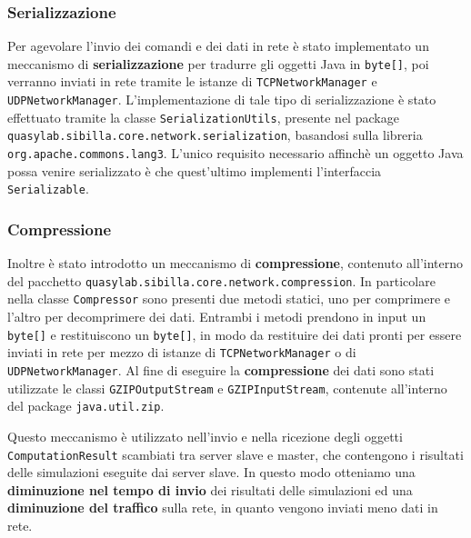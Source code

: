 \subsubsection{Serializzazione}

Per agevolare l'invio dei comandi e dei dati in rete è stato implementato un meccanismo di \textbf{serializzazione} per tradurre gli oggetti Java in \texttt{byte[]}, poi verranno inviati in rete tramite le istanze di \texttt{TCPNetworkManager} e \texttt{UDPNetworkManager}. 
L'implementazione di tale tipo di serializzazione è stato effettuato tramite la classe \texttt{SerializationUtils}, presente nel package \texttt{quasylab.sibilla.core.network.serialization}, basandosi sulla libreria \texttt{org.apache.commons.lang3}.
L'unico requisito necessario affinchè un oggetto Java possa venire serializzato è che quest'ultimo implementi l'interfaccia \texttt{Serializable}.

\subsubsection{Compressione}

Inoltre è stato introdotto un meccanismo di \textbf{compressione}, contenuto all'interno del pacchetto \texttt{quasylab.sibilla.core.network.compression}. In particolare nella classe \texttt{Compressor} sono presenti due metodi statici, uno per comprimere e l'altro per decomprimere dei dati. Entrambi i metodi prendono in input un \texttt{byte[]} e restituiscono un \texttt{byte[]}, in modo da restituire dei dati pronti per essere inviati in rete per mezzo di istanze di \texttt{TCPNetworkManager} o di \texttt{UDPNetworkManager}. Al fine di eseguire la \textbf{compressione} dei dati sono stati utilizzate le classi \texttt{GZIPOutputStream} e \texttt{GZIPInputStream}, contenute all'interno del package \texttt{java.util.zip}.

Questo meccanismo è utilizzato nell'invio e nella ricezione degli oggetti \texttt{ComputationResult} scambiati tra server slave e master, che contengono i risultati delle simulazioni eseguite dai server slave. In questo modo otteniamo una \textbf{diminuzione nel tempo di invio} dei risultati delle simulazioni ed una \textbf{diminuzione del traffico} sulla rete, in quanto vengono inviati meno dati in rete.